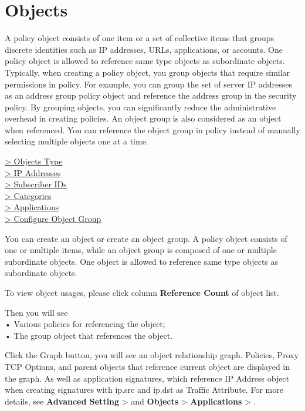 %
\chapter*{\hypertarget{link:Objects}{Objects}}
\label{sec:objects}

A policy object consists of one item or a set of collective items that groups discrete identities such as IP addresses, URLs, applications, or accounts. 
One policy object is allowed to reference same type objects as subordinate objects. Typically, when creating a policy object, you group objects that require similar permissions in policy. 
For example, you can group the set of server IP addresses as an address group policy object and reference the address group in the security policy. By grouping objects, 
you can significantly reduce the administrative overhead in creating policies. An object group is also considered as an object when referenced. 
You can reference the object group in policy instead of manually selecting multiple objects one at a time.

{
\color{linkblue}
\hyperlink{link:Objects Type}{> Objects Type} \\
\hyperlink{link:IP Addresses}{> IP Addresses} \\
\hyperlink{link:Subscriber IDs}{> Subscriber IDs}\\
\hyperlink{link:Categories}{> Categories}\\
\hyperlink{link:Applications}{> Applications}\\
\hyperlink{link:Configure Object Group}{> Configure Object Group}\\
}
\clearpage

You can create an object or create an object group. A policy object consists of one or multiple items, while an object group is composed of one or multiple subordinate objects. One object is allowed to reference same type objects as subordinate objects. 


To view object usages, please click column \textbf{Reference Count} of object list.


Then you will see\\
• Various policies for referencing the object; \\
• The group object that references the object.


Click the Graph button, you will see an object relationship graph. Policies, Proxy TCP Options, and parent objects that reference current object are displayed in the graph. 
As well as application signatures, which reference IP Address object when creating signatures with ip.src and ip.dst as Traffic Attribute. 
For more details, see \textbf{Advanced Setting} > \textbf{\hyperlink{link:Proxy TCP Option}{\color{linkblue}{Proxy TCP Option}}} and \textbf{Objects} > \textbf{Applications} > \textbf{\hyperlink{link:Signatures}{\color{linkblue}{Signatures}}}. 


